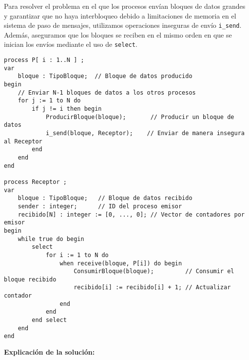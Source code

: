 \documentclass[a4paper,12pt]{article}
\begin{document}
Para resolver el problema en el que los procesos envían bloques de datos grandes y garantizar que no haya interbloqueo debido a limitaciones de memoria en el sistema de paso de mensajes, utilizamos operaciones inseguras de envío \texttt{i\_send}. Además, aseguramos que los bloques se reciben en el mismo orden en que se inician los envíos mediante el uso de \texttt{select}.

\begin{lstlisting}[style=customcpp]
process P[ i : 1..N ] ;
var
    bloque : TipoBloque;  // Bloque de datos producido
begin
    // Enviar N-1 bloques de datos a los otros procesos
    for j := 1 to N do
        if j != i then begin
            ProducirBloque(bloque);       // Producir un bloque de datos
            i_send(bloque, Receptor);    // Enviar de manera insegura al Receptor
        end
    end
end

process Receptor ;
var
    bloque : TipoBloque;   // Bloque de datos recibido
    sender : integer;      // ID del proceso emisor
    recibido[N] : integer := [0, ..., 0]; // Vector de contadores por emisor
begin
    while true do begin
        select
            for i := 1 to N do
                when receive(bloque, P[i]) do begin
                    ConsumirBloque(bloque);         // Consumir el bloque recibido
                    recibido[i] := recibido[i] + 1; // Actualizar contador
                end
            end
        end select
    end
end
\end{lstlisting}

\textbf{Explicación de la solución:}
\end{document}
